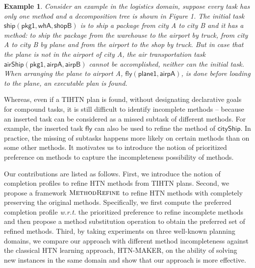 \documentclass[letterpaper]{article} %
\newtheorem{examp}{Example}
\begin{document}
\begin{examp}\label{examp:incomplte_methods}
Consider an example in the logistics domain, suppose every task has only one method and a decomposition tree is shown in Figure 1.
The initial task $\mathsf{ship(pkg1,whA,shopB)}$ is to ship a package from city A to city B and
it has a method: to ship the package from the warehouse to the airport by truck, from city A to city B by plane and from the airport to the shop by truck.
But in case that the plane is not in the airport of city A, the air transportation task $\mathsf{airShip(pkg1,airpA,airpB)}$ %
cannot be accomplished, neither can the initial task.
When arranging the plane to airport A, $\mathsf{fly(plane1,airpA)}$, is done before loading to the plane, an executable plan is found.
\end{examp}

Whereas, even if a TIHTN plan is found, without designating declarative goals for compound tasks,
it is still difficult to identify incomplete methods -- because an inserted task can be considered as a missed subtask of different methods.
For example, the inserted task $\mathsf{fly}$ can also be used to refine the method of $\mathsf{cityShip}$.
In practice, the missing of subtasks happens more likely on certain methods than on some other methods.
It motivates us to introduce  the notion of prioritized preference on methods to capture the incompleteness possibility of methods. %


Our contributions are listed as follows.
First, we introduce the notion of completion profiles to refine HTN methods from TIHTN plans.
Second, we propose a framework $\textsc{MethodRefine}$ to refine HTN methods with completely preserving the original methods.
Specifically,
we first compute the preferred completion profile \emph{w.r.t.} the prioritized preference to refine incomplete methods and then propose a method substitution operation to obtain the preferred set of refined methods.
Third, by taking experiments on three well-known planning domains, we compare our approach with different method incompleteness against the classical HTN learning approach, HTN-MAKER, on the ability of solving new instances in the same domain and show that our approach is more effective. %
\end{document}
